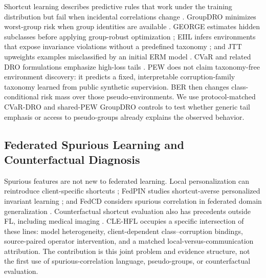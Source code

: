Shortcut learning describes predictive rules that work under the training distribution but fail when incidental correlations change \citep{geirhos2020shortcut}. GroupDRO minimizes worst-group risk when group identities are available \citep{sagawa2020groupdro}. GEORGE estimates hidden subclasses before applying group-robust optimization \citep{sohoni2020george}; EIIL infers environments that expose invariance violations without a predefined taxonomy \citep{creager2021eiil}; and JTT upweights examples misclassified by an initial ERM model \citep{liu2021jtt}. CVaR and related DRO formulations emphasize high-loss tails \citep{rockafellar2000cvar,duchi2021uniform}. PEW does not claim taxonomy-free environment discovery: it predicts a fixed, interpretable corruption-family taxonomy learned from public synthetic supervision. BER then changes class-conditional risk mass over those pseudo-environments. We use protocol-matched CVaR-DRO and shared-PEW GroupDRO controls to test whether generic tail emphasis or access to pseudo-groups already explains the observed behavior.

\subsection{Federated Spurious Learning and Counterfactual Diagnosis}

Spurious features are not new to federated learning. Local personalization can reintroduce client-specific shortcuts \citep{wang2024pflspurious}; FedPIN studies shortcut-averse personalized invariant learning \citep{tang2024fedpin}; and FedCD considers spurious correlation in federated domain generalization \citep{ma2024fedcd}. Counterfactual shortcut evaluation also has precedents outside FL, including medical imaging \citep{vigneshwaran2026counterfactual,jabbour2020chestxray}. CLE-HFL occupies a specific intersection of these lines: model heterogeneity, client-dependent class--corruption bindings, source-paired operator intervention, and a matched local-versus-communication attribution. The contribution is this joint problem and evidence structure, not the first use of spurious-correlation language, pseudo-groups, or counterfactual evaluation.
